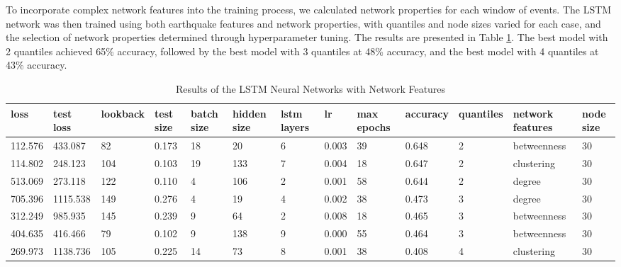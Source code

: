 \documentclass[sn-mathphys-num]{sn-jnl}
\begin{document}
To incorporate complex network features into the training process, we calculated network properties for each window of events. The LSTM network was then trained using both earthquake features and network properties, with quantiles and node sizes varied for each case, and the selection of network properties determined through hyperparameter tuning. The results are presented in Table \ref{tab3}. The best model with 2 quantiles achieved 65\% accuracy, followed by the best model with 3 quantiles at 48\% accuracy, and the best model with 4 quantiles at 43\% accuracy.

\begin{table}
    \caption{Results of the LSTM Neural Networks with Network Features}\label{tab3}
    
    \begin{tabularx}{\textwidth}{@{}XXXXXXXXXXXll@{}}
        \toprule
        loss     & test loss & lookback & test size & batch size & hidden size & lstm layers & lr    & max epochs & accuracy & quantiles & network features & node size \\
        \midrule
        112.576  & 433.087   & 82       & 0.173     & 18         & 20          & 6           & 0.003 & 39         & 0.648    & 2         & betweenness      & 30        \\
        114.802  & 248.123   & 104      & 0.103     & 19         & 133         & 7           & 0.004 & 18         & 0.647    & 2         & clustering       & 30        \\
        513.069  & 273.118   & 122      & 0.110     & 4          & 106         & 2           & 0.001 & 58         & 0.644    & 2         & degree           & 30        \\
        \midrule
        705.396  & 1115.538  & 149      & 0.276     & 4          & 19          & 4           & 0.002 & 38         & 0.473    & 3         & degree           & 30        \\
        312.249  & 985.935   & 145      & 0.239     & 9          & 64          & 2           & 0.008 & 18         & 0.465    & 3         & betweenness      & 30        \\
        404.635  & 416.466   & 79       & 0.102     & 9          & 138         & 9           & 0.000 & 55         & 0.464    & 3         & betweenness      & 30        \\
        \midrule
        269.973  & 1138.736  & 105      & 0.225     & 14         & 73          & 8           & 0.001 & 38         & 0.408    & 4         & clustering       & 30        \\

\end{tabularx}
\end{table}
\end{document}
